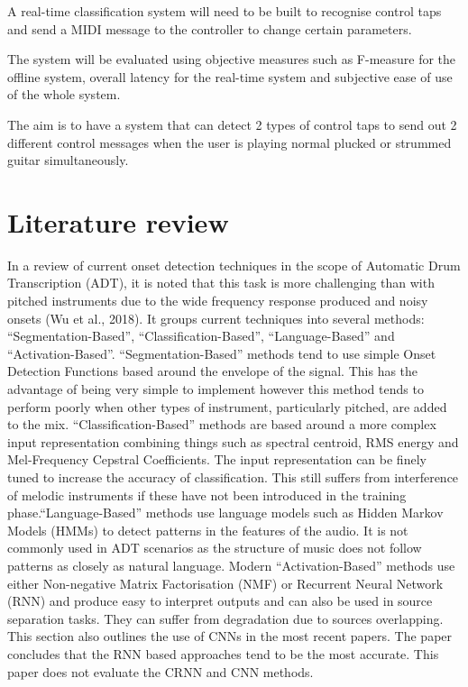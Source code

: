 \documentclass[conference]{IEEEtran}
\begin{document}
A real-time classification system will need to be built to recognise control taps and send a MIDI message to the controller to change certain parameters.

The system will be evaluated using objective measures such as F-measure for the offline system, overall latency for the real-time system and subjective ease of use of the whole system.

The aim is to have a system that can detect 2 types of control taps to send out 2 different control messages when the user is playing normal plucked or strummed guitar simultaneously.

\section{Literature review}
In a review of current onset detection techniques in the scope of Automatic Drum Transcription (ADT), it is noted that this task is more challenging than with pitched instruments
due to the wide frequency response produced and noisy onsets (Wu et al., 2018). It groups current techniques into several methods: ``Segmentation-Based'', ``Classification-Based'', ``Language-Based''
and ``Activation-Based''. ``Segmentation-Based'' methods tend to use simple Onset Detection Functions based around the envelope of the signal. This has the advantage of being very simple
to implement however this method tends to perform poorly when other types of instrument, particularly pitched, are added to the mix. ``Classification-Based'' methods are based around
a more complex input representation combining things such as spectral centroid, RMS energy and Mel-Frequency Cepstral Coefficients. The input representation can be finely tuned to increase
the accuracy of classification. This still suffers from interference of melodic instruments if these have not been introduced in the training phase.``Language-Based'' methods use language
models such as Hidden Markov Models (HMMs) to detect patterns in the features of the audio. It is not commonly used in ADT scenarios as the structure of music does not follow patterns
as closely as natural language. Modern ``Activation-Based'' methods use either Non-negative Matrix Factorisation (NMF) or Recurrent Neural Network (RNN) and produce easy to interpret
outputs and can also be used in source separation tasks. They can suffer from degradation due to sources overlapping. This section also outlines the use of CNNs in the most recent papers. 
The paper concludes that the RNN based approaches tend to be the most accurate. This paper does not evaluate the CRNN and CNN methods. 
\end{document}
